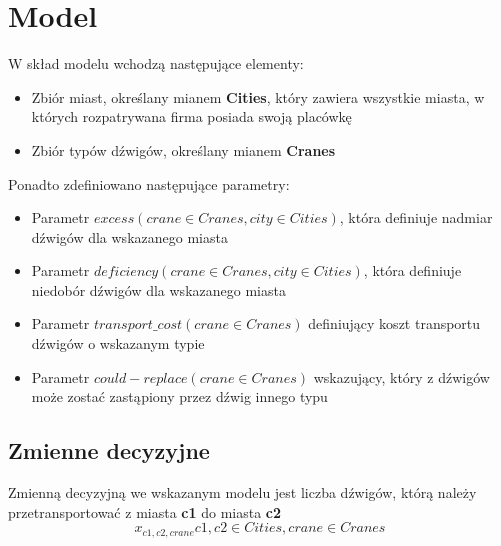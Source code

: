 \documentclass[a4paper,14pt]{report}
\begin{document}
\section{Model}
    W skład modelu wchodzą następujące elementy:
    \begin{itemize}
        \item Zbiór miast, określany mianem \textbf{Cities}, który zawiera
        wszystkie miasta, w których rozpatrywana firma posiada swoją placówkę
        \item Zbiór typów dźwigów, określany mianem \textbf{Cranes}
    \end{itemize}
    Ponadto zdefiniowano następujące parametry:
    \begin{itemize}
        \item Parametr $excess(crane \in Cranes, city \in Cities)$, która definiuje nadmiar dźwigów dla wskazanego miasta
        \item Parametr $deficiency(crane \in Cranes, city \in Cities)$, która definiuje niedobór dźwigów dla wskazanego miasta
        \item Parametr $transport\_cost(crane \in Cranes)$ definiujący koszt transportu dźwigów o wskazanym typie
        \item Parametr $could-replace(crane \in Cranes)$ wskazujący, który z dźwigów może zostać zastąpiony przez dźwig innego typu
    \end{itemize}

    \subsection{Zmienne decyzyjne}
        Zmienną decyzyjną we wskazanym modelu jest liczba dźwigów, którą należy przetransportować z miasta \textbf{c1} do miasta \textbf{c2}
        \begin{equation}
            x_{c1,c2,crane} c1,c2 \in Cities, crane \in Cranes
        \end{equation}
\end{document}
